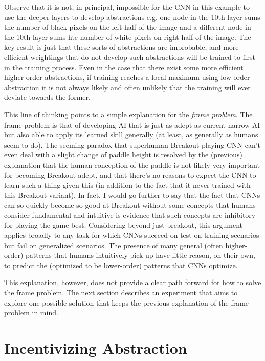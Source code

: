 \documentclass{article}
\renewcommand{\it}{\textit}
\begin{document}
Observe that it is not, in principal, impossible for the CNN in this example to use the deeper layers to develop abstractions e.g. one node in the 10th layer sums the number of black pixels on the left half of the image and a different node in the 10th layer sums hte number of white pixels on right half of the image.
The key result is just that these sorts of abstractions are improbable, and more efficient weightings that do not develop such abstractions will be trained to first in the training process.
Even in the case that there exist some more efficient higher-order abstractions, if training reaches a local maximum using low-order abstraction it is not always likely and often unlikely that the training will ever deviate towards the former.

This line of thinking points to a simple explanation for the \it{frame problem}.
The frame problem is that of developing AI that is just as adept as current narrow AI but also able to apply its learned skill generally (at least, as generally as humans seem to do).
The seeming paradox that superhuman Breakout-playing CNN can't even deal with a slight change of paddle height is resolved by the (previous) explanation that the human conception of the paddle is not likely very important for becoming Breakout-adept, and that there's no reasons to expect the CNN to learn such a thing given this (in addition to the fact that it never trained with this Breakout variant).
In fact, I would go further to say that the fact that CNNs can so quickly become so good at Breakout without some concepts that humans consider fundamental and intuitive is evidence that such concepts are inhibitory for playing the game best.
Considering beyond just breakout, this argument applies broadly to any task for which CNNs succeed on test on training scenarios but fail on generalized scenarios.
The presence of many general (often higher-order) patterns that humans intuitively pick up have little reason, on their own, to predict the (optimized to be lower-order) patterns that CNNs optimize.

This explanation, however, does not provide a clear path forward for how to solve the frame problem.
The next section describes an experiment that aims to explore one possible solution that keeps the previous explanation of the frame problem in mind.

\section{Incentivizing Abstraction}
\end{document}
